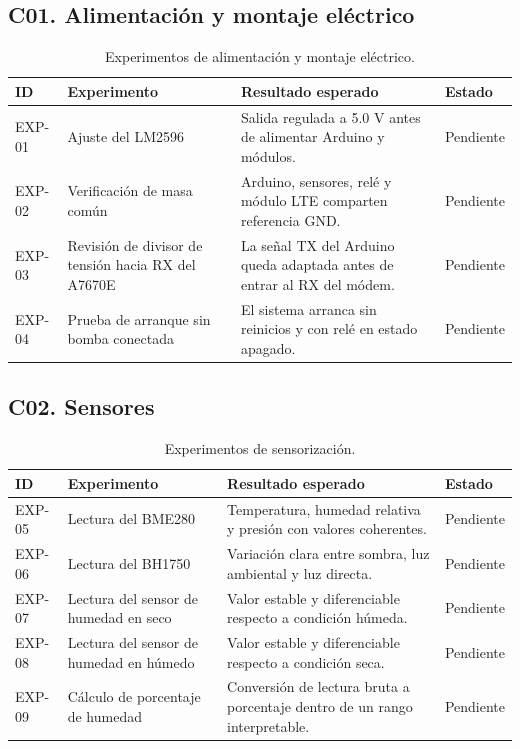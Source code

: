 \subsection{C01. Alimentación y montaje eléctrico}

\begin{table}[H]
\centering
\renewcommand{\arraystretch}{1.2}
\scriptsize
\begin{tabular}{|p{}|p{}|p{}|p{}|}
\hline
\rowcolor{gray!20}
\textbf{ID} & \textbf{Experimento} & \textbf{Resultado esperado} & \textbf{Estado} \\
\hline
EXP-01 & Ajuste del LM2596 & Salida regulada a 5.0 V antes de alimentar Arduino y módulos. & Pendiente \\
\hline
EXP-02 & Verificación de masa común & Arduino, sensores, relé y módulo LTE comparten referencia GND. & Pendiente \\
\hline
EXP-03 & Revisión de divisor de tensión hacia RX del A7670E & La señal TX del Arduino queda adaptada antes de entrar al RX del módem. & Pendiente \\
\hline
EXP-04 & Prueba de arranque sin bomba conectada & El sistema arranca sin reinicios y con relé en estado apagado. & Pendiente \\
\hline
\end{tabular}
\caption{Experimentos de alimentación y montaje eléctrico.}
\label{tab:exp_alimentacion}
\end{table}

\subsection{C02. Sensores}

\begin{table}[H]
\centering
\renewcommand{\arraystretch}{1.2}
\scriptsize
\begin{tabular}{|p{}|p{}|p{}|p{}|}
\hline
\rowcolor{gray!20}
\textbf{ID} & \textbf{Experimento} & \textbf{Resultado esperado} & \textbf{Estado} \\
\hline
EXP-05 & Lectura del BME280 & Temperatura, humedad relativa y presión con valores coherentes. & Pendiente \\
\hline
EXP-06 & Lectura del BH1750 & Variación clara entre sombra, luz ambiental y luz directa. & Pendiente \\
\hline
EXP-07 & Lectura del sensor de humedad en seco & Valor estable y diferenciable respecto a condición húmeda. & Pendiente \\
\hline
EXP-08 & Lectura del sensor de humedad en húmedo & Valor estable y diferenciable respecto a condición seca. & Pendiente \\
\hline
EXP-09 & Cálculo de porcentaje de humedad & Conversión de lectura bruta a porcentaje dentro de un rango interpretable. & Pendiente \\
\hline
\end{tabular}
\caption{Experimentos de sensorización.}
\label{tab:exp_sensores}
\end{table}

